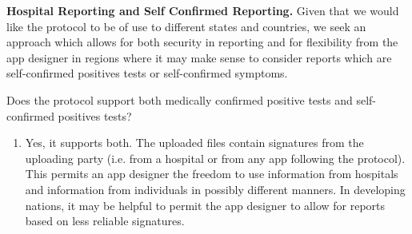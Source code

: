 \documentclass{article}
\begin{document}
\textbf{Hospital Reporting and Self Confirmed Reporting.} 
Given that we would like the protocol to be of use to different states and countries, we seek an approach which allows for both security in reporting and for flexibility from the app designer in regions where it may make sense to  consider reports which are self-confirmed positives tests or self-confirmed symptoms.

Does the protocol support both medically confirmed positive tests and self-confirmed positives tests?
\begin{enumerate}[leftmargin=*]

\item Yes, it supports both. The uploaded files contain signatures from the uploading party (i.e. from a hospital or from any app following the protocol). This permits an app designer the freedom to use information from hospitals and information from individuals in possibly different manners. In developing nations, it may be helpful to permit the app designer to allow for reports based on less reliable signatures. 

\end{enumerate}

\iffalse
\textbf{Surveillance.} 
Finally, it is helpful to contrast the goals in PACT to several high-profile tracing protocols and mechanisms employed to date in other countries.

\begin{enumerate}[leftmargin=*]
\item How does PACT contrast to approaches of other governments?

Countries have various approaches that trade off various aspects of civil liberties and privacy.  PACT is designed to provide valuable services for mitigating the flow of infection through a population, while taking a privacy-first approach to tracing, focusing on the critical and central challenge of privacy. We seek to provide transparent procedures and protocols so that the security and privacy concerns can be upheld for any citizen to examine and to engage with in a voluntary and informed manner.  In this spirit, the privacy guarantees of PACT are designed to be consistent with the disclosures already extant in contract tracing methods done by public health services. 

\end{enumerate}
\fi
\end{document}
